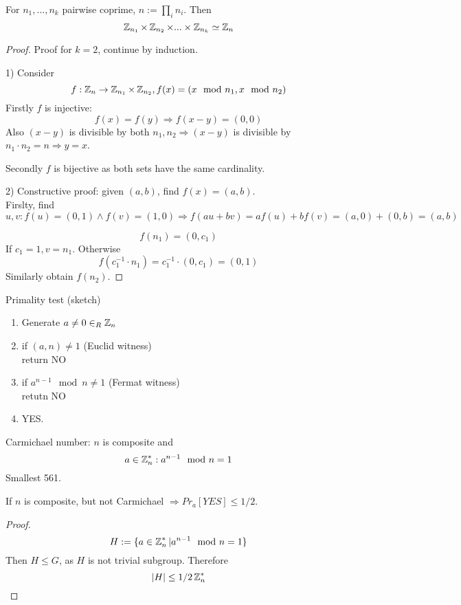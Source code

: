 \begin{theorem}
	For $n_1,..., n_k$ pairwise coprime, $n := \prod_i n_i$. Then
	\[ \operatorname{\mathbb{Z}}_{n_1} \times \operatorname{\mathbb{Z}}_{n_2} \times ... \times \operatorname{\mathbb{Z}}_{n_k} \simeq \operatorname{\mathbb{Z}}_n \]
\end{theorem}
\begin{proof}
	Proof for $k = 2$, continue by induction.

	1) Consider
	\[ f:\operatorname{\mathbb{Z}}_n \to \operatorname{\mathbb{Z}}_{n_1} \times \operatorname{\mathbb{Z}}_{n_2}, f(x) = (x \mod n_1, x \mod n_2) \]
	Firstly $f$ is injective:
	\[ f(x) = f(y) \Rightarrow f(x - y) = (0,0) \]
	Also $(x - y)$ is divisible by both $n_1, n_2 \Rightarrow (x - y)$ is divisible by $n_1 \cdot n_2 = n \Rightarrow y = x$.

	Secondly $f$ is bijective as both sets have the same cardinality.

	2) Constructive proof: given $(a,b)$, find $f(x) = (a,b)$.\\
	Firslty, find
	\[ u,v: f(u) = (0, 1) \land f(v) = (1, 0) \Rightarrow f(au + bv) = af(u) + b f(v) = (a,0) + (0,b) = (a,b) \]

	\[ f(n_1) = (0, c_1) \]
	If $c_1 = 1, v = n_1$. Otherwise
	\[ f(c_1^{-1} \cdot n_1) = c_1^{-1} \cdot (0, c_1) = (0, 1) \]
	Similarly obtain $f(n_2)$.
\end{proof}
Primality test (sketch)
\begin{enumerate}
	\item Generate $a \ne 0 \in_R \operatorname{\mathbb{Z}}_n$
	\item if $(a, n) \ne 1$ (Euclid witness)\\
		return NO
	\item if $a^{n - 1} \mod n \neq 1$ (Fermat witness)\\
		retutn NO
	\item YES.
\end{enumerate}

\begin{definition}
	Carmichael number: $n$ is composite and
	\[ a \in \operatorname{\mathbb{Z}}_n^{\ast}: a^{n - 1} \mod n = 1 \]
	Smallest 561.
\end{definition}

\begin{theorem}
	If $n$ is composite, but not Carmichael $\Rightarrow Pr_a[YES] \leq 1/2$.
\end{theorem}
\begin{proof}
	\[ H := \{ a \in \operatorname{\mathbb{Z}}_n^{\ast} | a^{n - 1} \mod n = 1 \} \]
	Then $H \leq G$, as $H$ is not trivial subgroup. Therefore
	\[ |H| \leq 1/2 \operatorname{\mathbb{Z}}_n^{\ast} \]
\end{proof}
